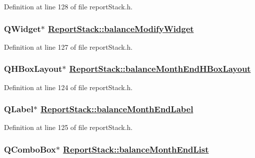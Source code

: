 Definition at line 128 of file report\-Stack.h.\hypertarget{classReportStack_r52}{
\subsubsection[balanceModifyWidget]{\setlength{\rightskip}{0pt plus 5cm}QWidget$\ast$ \hyperlink{classReportStack_r52}{Report\-Stack::balance\-Modify\-Widget}}}
\label{classReportStack_r52}


Definition at line 127 of file report\-Stack.h.\hypertarget{classReportStack_r49}{
\subsubsection[balanceMonthEndHBoxLayout]{\setlength{\rightskip}{0pt plus 5cm}QHBox\-Layout$\ast$ \hyperlink{classReportStack_r49}{Report\-Stack::balance\-Month\-End\-HBox\-Layout}}}
\label{classReportStack_r49}


Definition at line 124 of file report\-Stack.h.\hypertarget{classReportStack_r50}{
\subsubsection[balanceMonthEndLabel]{\setlength{\rightskip}{0pt plus 5cm}QLabel$\ast$ \hyperlink{classReportStack_r50}{Report\-Stack::balance\-Month\-End\-Label}}}
\label{classReportStack_r50}


Definition at line 125 of file report\-Stack.h.\hypertarget{classReportStack_r51}{
\subsubsection[balanceMonthEndList]{\setlength{\rightskip}{0pt plus 5cm}QCombo\-Box$\ast$ \hyperlink{classReportStack_r51}{Report\-Stack::balance\-Month\-End\-List}}}
\label{classReportStack_r51}


